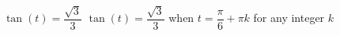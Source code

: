 {$\tan(t) = \dfrac{\sqrt{3}}{3}$}
{$\tan(t) = \dfrac{\sqrt{3}}{3}$ when $t = \dfrac{\pi}{6} + \pi k$ for any integer $k$}
